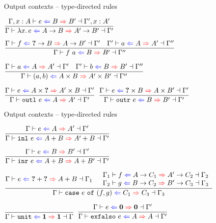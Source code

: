 \documentclass{beamer}
\begin{document}
\begin{frame}{Output contexts -- type-directed rules}

\begin{center}
  $\infrule{\fulloutctx{\extend{\Gamma}{x}{A}}{e}{B}{B'}{\extend{\Gamma'}{x}{A'}}}{\outctx{\fun{x}{e}}{\Fun{A}{B}}{\Fun{A'}{B'}}}$

  \vspace{1em}

  $\infrule{\fulloutctx{\Gamma}{f}{\Fun{\Hole}{B}}{\Fun{A}{B'}}{\Gamma'} \quad \fulloutctx{\Gamma'}{a}{A}{A'}{\Gamma''}}{\fulloutctx{\Gamma}{\app{f}{a}}{B}{B'}{\Gamma''}}$

  \vspace{1em}

  $\infrule{\fulloutctx{\Gamma}{a}{A}{A'}{\Gamma'} \quad \fulloutctx{\Gamma'}{b}{B}{B'}{\Gamma''}}{\fulloutctx{\Gamma}{\pair{a}{b}}{\Prod{A}{B}}{\Prod{A'}{B'}}{\Gamma''}}$

  \vspace{1em}

  $\infrule{\outctx{e}{\Prod{A}{\Hole}}{\Prod{A'}{B}}}{\outctx{\outl{e}}{A}{A'}}$
  \quad
  $\infrule{\outctx{e}{\Prod{\Hole}{B}}{\Prod{A}{B'}}}{\outctx{\outr{e}}{B}{B'}}$
\end{center}

\end{frame}

\begin{frame}{Output contexts -- type-directed rules}

\begin{center}
  $\infrule{\outctx{e}{A}{A'}}{\outctx{\inl{e}}{\Sum{A}{B}}{\Sum{A'}{B}}}$

  \vspace{2em}

  $\infrule{\outctx{e}{B}{B'}}{\outctx{\inr{e}}{\Sum{A}{B}}{\Sum{A}{B'}}}$

  \vspace{2em}

  $\infrule{\fulloutctx{\Gamma}{e}{\Sum{\Hole}{\Hole}}{\Sum{A}{B}}{\Gamma_1} \quad \begin{array}{c} \fulloutctx{\Gamma_1}{f}{\Fun{A}{C_1}}{\Fun{A'}{C_2}}{\Gamma_2} \\ \fulloutctx{\Gamma_2}{g}{\Fun{B}{C_2}}{\Fun{B'}{C_3}}{\Gamma_3} \end{array}}{\fulloutctx{\Gamma}{\case{e}{f}{g}}{C_1}{C_3}{\Gamma_3}}$

  \vspace{2em}

  $\infrule{}{\fulloutctx{\Gamma}{\unit}{\Unit}{\Unit}{\Gamma}}$
  \quad
  $\infrule{\outctx{e}{\Empty}{\Empty}}{\outctx{\exfalso{e}}{A}{A}}$
\end{center}

\end{frame}
\end{document}

